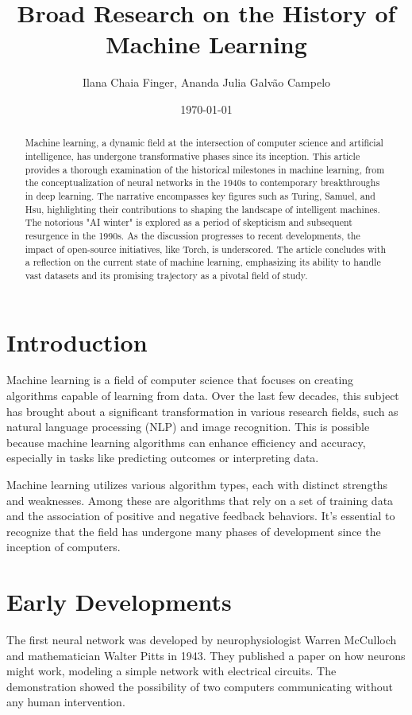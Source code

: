 \documentclass{article}
\title{Broad Research on the History of Machine Learning}
\author{Ilana Chaia Finger, Ananda Julia Galvão Campelo}
\date{\today}
\begin{document}
\maketitle
\vspace{2\baselineskip}
\begin{abstract}
Machine learning, a dynamic field at the intersection of computer science and artificial intelligence, has undergone transformative phases since its inception. This article provides a thorough examination of the historical milestones in machine learning, from the conceptualization of neural networks in the 1940s to contemporary breakthroughs in deep learning. The narrative encompasses key figures such as Turing, Samuel, and Hsu, highlighting their contributions to shaping the landscape of intelligent machines. The notorious "AI winter" is explored as a period of skepticism and subsequent resurgence in the 1990s. As the discussion progresses to recent developments, the impact of open-source initiatives, like Torch, is underscored. The article concludes with a reflection on the current state of machine learning, emphasizing its ability to handle vast datasets and its promising trajectory as a pivotal field of study.
\end{abstract}
\vspace{1\baselineskip}
\section{Introduction}
Machine learning is a field of computer science that focuses on creating algorithms capable of learning from data. Over the last few decades, this subject has brought about a significant transformation in various research fields, such as natural language processing (NLP) and image recognition. This is possible because machine learning algorithms can enhance efficiency and accuracy, especially in tasks like predicting outcomes or interpreting data. 
\par
Machine learning utilizes various algorithm types, each with distinct strengths and weaknesses. Among these are algorithms that rely on a set of training data and the association of positive and negative feedback behaviors. It's essential to recognize that the field has undergone many phases of development since the inception of computers. 
\par
\section{Early Developments}
The first neural network was developed by neurophysiologist Warren McCulloch and mathematician Walter Pitts in 1943. They published a paper on how neurons might work, modeling a simple network with electrical circuits. The demonstration showed the possibility of two computers communicating without any human intervention. 
\par
\end{document}
